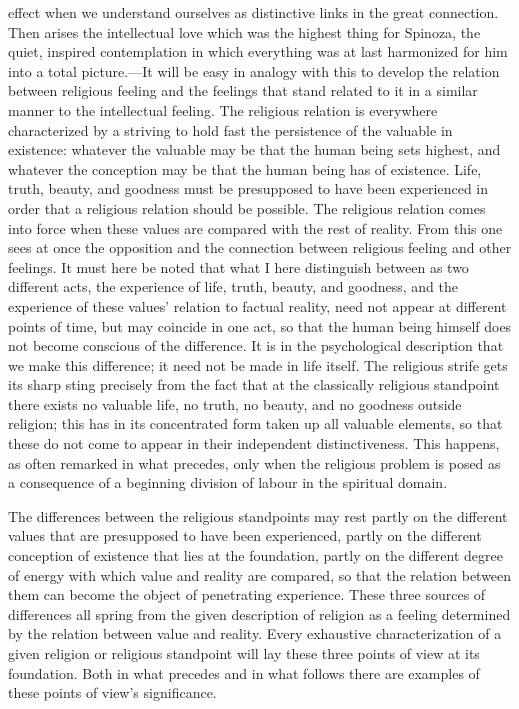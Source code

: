 \documentclass[12pt,a4paper]{book}
\newcommand{\opage}[1]{\marginnote{\footnotesize\textit{[#1]}}}
\begin{document}
effect when we understand ourselves as distinctive links in the great connection.
Then arises the intellectual love which was the highest thing for Spinoza, the
quiet, inspired contemplation in which everything was at last harmonized for him
into a total picture.---It will be easy in analogy with this to develop the
relation between religious feeling and the feelings that stand related to it in a
similar manner to the intellectual feeling. The religious relation is everywhere
characterized by a striving to hold fast the persistence of the valuable in
existence: whatever the valuable may be that the human being sets highest, and
whatever the conception may be that the human being has of existence. Life,
truth, beauty, and goodness must be presupposed to have been experienced in order
that a religious relation should be possible. The religious relation comes into
force when these values are compared with the rest of reality. From this one sees
at once the opposition and the connection between religious feeling and other
feelings. It must here be noted that what I here distinguish between as two
different acts, the experience of life, truth, beauty, and goodness, and the
experience of these values' relation to factual reality, need not appear at
different points of time, but may coincide in one act, so that the human being
himself does not become conscious of the difference. It is in the psychological
description that we make this difference; it need not be made in life itself. The
religious strife gets its sharp sting precisely from the fact that at the
classically religious standpoint there exists no valuable life, no truth, no
beauty, and no goodness outside religion; this has in its concentrated form taken
up all valuable elements, so that these do not come to appear in their
independent distinctiveness. This happens, as often remarked in what precedes,
only when the religious problem is posed as a consequence of a beginning division
of labour in the spiritual domain.

The differences between the religious standpoints may rest partly on the
different values that are presupposed to have been experienced, partly on the
different conception of existence that lies at the foundation, partly on the
different degree of energy with which value and reality are compared, so that
the relation between them can become 
\opage{68}the object of penetrating experience. These
three sources of differences all spring from the given description of religion as
a feeling determined by the relation between value and reality. Every exhaustive
characterization of a given religion or religious standpoint will lay these three
points of view at its foundation. Both in what precedes and in what follows there
are examples of these points of view's significance.
\end{document}
